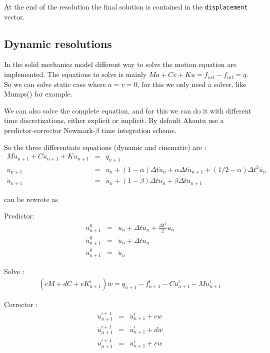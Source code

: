 \documentclass[a4paper,11pt]{book}
\newcommand{\code}[1]{{\tt{#1}}}
\begin{document}
At  the  end  of  the  resolution   the  final  solution  is  contained  in  the
\code{displacement} vector.


\subsection{Dynamic resolutions}
In the  solid mechanics  model different  way to solve  the motion  equation are
implemented.  The equations  to  solve is  mainly  $Ma +  Cv +  Ku  = f_{ext}  -
f_{int} = q$. So we can solve static case where $a = v = 0$, for this we only need a
solver, like Mumps(\cite{mumps}) for example.

We  can also  solve  the complete  equation,  and for  this we  can  do it  with
different time discretizations, either  explicit or implicit.  By default Akantu
use  a  predictor-corrector  Newmark-$\beta$  time integration  scheme.

So the three differentiate equations (dynamic and cinematic) are \cite{curnier92a}:
\begin{eqnarray}
  M \ddot{u}_{n+1} + C \dot{u}_{n+1} + K u_{n+1} &=& q_{n+1} \\
  u_{n+1} &=& u_{n} + (1 - \alpha) \Delta t \dot{u}_{n} + \alpha \Delta t \dot{u}_{n+1} + (1/2 - \alpha) \Delta t^2 \ddot{u}_n \\
  \dot{u}_{n+1} &=& \dot{u}_{n} + (1 - \beta) \Delta t \ddot{u}_{n} + \beta \Delta t \ddot{u}_{n+1}
\end{eqnarray}

can be rewrote as

\noindent Predictor:
\begin{eqnarray}
  u^{0}_{n+1}        &=& u_{n} +  \Delta t \dot{u}_n + \frac{\Delta t^2}{2} \ddot{u}_n \\
  \dot{u}^{0}_{n+1}  &=& \dot{u}_{n} +  \Delta t \ddot{u}_{n} \\
  \ddot{u}^{0}_{n+1} &=& \ddot{u}_{n}
\end{eqnarray}

\noindent Solve :
\begin{eqnarray}
 (c M + d C + e K^i_{n+1}) w = q_{n+1} - f^i_{n+1} - C \dot{u}^i_{n+1} - M \ddot{u}^i_{n+1}
\end{eqnarray}

\noindent Corrector :
\begin{eqnarray}
  \ddot{u}^{i+1}_{n+1} &=& \ddot{u}^{i}_{n+1} + c w \\
  \dot{u}^{i+1}_{n+1} &=& \dot{u}^{i}_{n+1} + d w \\
  u^{i+1}_{n+1} &=& u^{i}_{n+1} + e w
\end{eqnarray}
\end{document}
